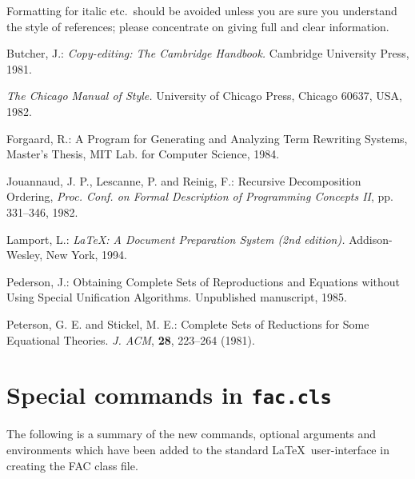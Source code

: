 \documentclass{fac}
\begin{document}
Formatting for italic etc.\ should be avoided unless you are sure you
understand the style of references; please concentrate on giving full and
clear information.

\begin{thebibliography}{Lam94}
   Butcher, J.:
    \emph{Copy-editing: The Cambridge Handbook.}
    Cambridge University Press, 1981.

    \emph{The Chicago Manual of Style.}
    University of Chicago Press, Chicago 60637, USA, 1982.

   Forgaard, R.:
    A Program for Generating and Analyzing Term Rewriting
    Systems, Master's Thesis, MIT Lab. for Computer Science,
    1984.

   Jouannaud, J. P., Lescanne, P.
    and Reinig, F.: Recursive Decomposition Ordering,
   \emph{Proc. Conf. on Formal Description of Programming
    Concepts II}, pp. 331--346, 1982.

   Lamport, L.:
    \emph{\LaTeX: A Document Preparation System (2nd edition).}
    Addison-Wesley, New York, 1994.

   Pederson, J.:
    Obtaining Complete Sets of Reproductions and Equations
    without Using Special Unification Algorithms. Unpublished
    manuscript, 1985.

   Peterson, G. E. and Stickel,
    M. E.: Complete Sets of Reductions for Some Equational
    Theories. \emph{J. ACM}, \textbf{28}, 223--264 (1981).
\end{thebibliography}

\newpage

\appendix
\section{Special commands in \texttt{fac.cls}}

The following is a summary of the new commands, optional arguments and
environments which have been added to the standard \LaTeX\ user-interface
in creating the FAC class file.
\vspace{6pt}
\end{document}
